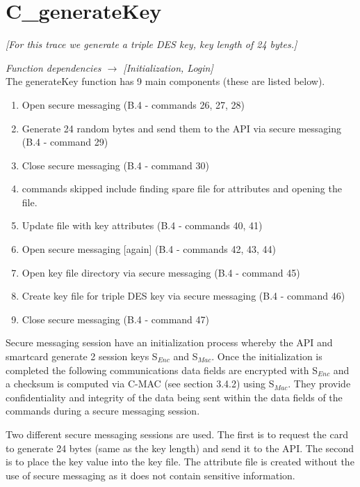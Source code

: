 \documentclass[bsc,frontabs,twoside,singlespacing,parskip,deptreport]{infthesis}     %
\begin{document}
\section{C\_generateKey}
\textit{[For this trace we generate a triple DES key, key length of 24 bytes.]}

\textit{Function dependencies $\rightarrow$ [Initialization, Login]}\\

The generateKey function has 9 main components (these are listed below).

\begin{enumerate}
\item Open secure messaging (B.4 - commands 26, 27, 28)
\item Generate 24 random bytes and send them to the API via secure messaging (B.4 - command 29)
\item Close secure messaging (B.4 - command 30)
\item commands skipped include finding spare file for attributes and opening the file.
\item Update file with key attributes (B.4 - commands 40, 41)
\item Open secure messaging [again] (B.4 - commands 42, 43, 44)
\item Open key file directory via secure messaging (B.4 - command 45)
\item Create key file for triple DES key via secure messaging (B.4 - command 46)
\item Close secure messaging (B.4 - command 47)\\
\end{enumerate}

Secure messaging session have an initialization process whereby the API and smartcard generate 2 session keys S$_{Enc}$ and S$_{Mac}$. Once the initialization is completed the following communications data fields are encrypted with S$_{Enc}$ and a checksum is computed via C-MAC (see section 3.4.2) using S$_{Mac}$. They provide confidentiality and integrity of the data being sent within the data fields of the commands during a secure messaging session.

Two different secure messaging sessions are used. The first is to request the card to generate 24 bytes (same as the key length) and send it to the API. The second is to place the key value into the key file. The attribute file is created without the use of secure messaging as it does not contain sensitive information.
\end{document}
